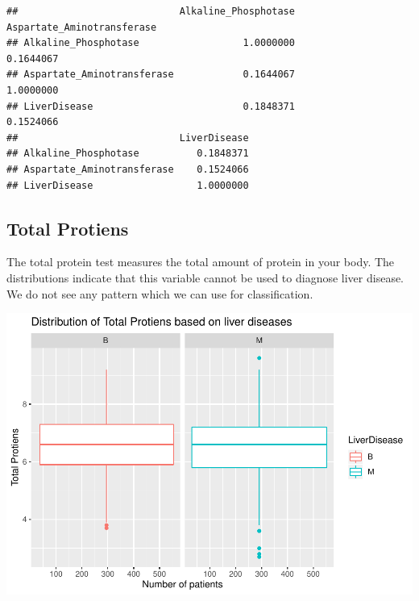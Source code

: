 \documentclass[]{article}
\newenvironment{Shaded}{\begin{snugshade}}{\end{snugshade}}
\newcommand{\CommentTok}[1]{\textcolor[rgb]{0.56,0.35,0.01}{\textit{#1}}}
\newcommand{\DataTypeTok}[1]{\textcolor[rgb]{0.13,0.29,0.53}{#1}}
\newcommand{\KeywordTok}[1]{\textcolor[rgb]{0.13,0.29,0.53}{\textbf{#1}}}
\newcommand{\NormalTok}[1]{#1}
\newcommand{\OperatorTok}[1]{\textcolor[rgb]{0.81,0.36,0.00}{\textbf{#1}}}
\newcommand{\StringTok}[1]{\textcolor[rgb]{0.31,0.60,0.02}{#1}}
\begin{document}
\begin{verbatim}
##                            Alkaline_Phosphotase Aspartate_Aminotransferase
## Alkaline_Phosphotase                  1.0000000                  0.1644067
## Aspartate_Aminotransferase            0.1644067                  1.0000000
## LiverDisease                          0.1848371                  0.1524066
##                            LiverDisease
## Alkaline_Phosphotase          0.1848371
## Aspartate_Aminotransferase    0.1524066
## LiverDisease                  1.0000000
\end{verbatim}

\subsection{Total Protiens}

The total protein test measures the total amount of protein in your
body. The distributions indicate that this variable cannot be used to
diagnose liver disease. We do not see any pattern which we can use for
classification.

\begin{Shaded}
\end{Shaded}

\includegraphics{LiverDisease_files/figure-latex/unnamed-chunk-21-1.pdf}
\end{document}
